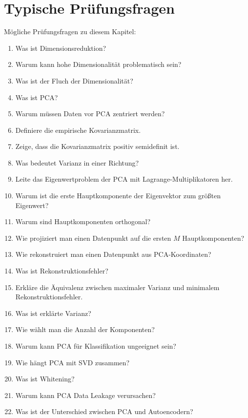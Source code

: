 \section{Typische Prüfungsfragen}

\begin{examtipbox}
Mögliche Prüfungsfragen zu diesem Kapitel:

\begin{enumerate}
    \item Was ist Dimensionsreduktion?
    \item Warum kann hohe Dimensionalität problematisch sein?
    \item Was ist der Fluch der Dimensionalität?
    \item Was ist PCA?
    \item Warum müssen Daten vor PCA zentriert werden?
    \item Definiere die empirische Kovarianzmatrix.
    \item Zeige, dass die Kovarianzmatrix positiv semidefinit ist.
    \item Was bedeutet Varianz in einer Richtung?
    \item Leite das Eigenwertproblem der PCA mit Lagrange-Multiplikatoren her.
    \item Warum ist die erste Hauptkomponente der Eigenvektor zum größten Eigenwert?
    \item Warum sind Hauptkomponenten orthogonal?
    \item Wie projiziert man einen Datenpunkt auf die ersten \(M\) Hauptkomponenten?
    \item Wie rekonstruiert man einen Datenpunkt aus PCA-Koordinaten?
    \item Was ist Rekonstruktionsfehler?
    \item Erkläre die Äquivalenz zwischen maximaler Varianz und minimalem Rekonstruktionsfehler.
    \item Was ist erklärte Varianz?
    \item Wie wählt man die Anzahl der Komponenten?
    \item Warum kann PCA für Klassifikation ungeeignet sein?
    \item Wie hängt PCA mit SVD zusammen?
    \item Was ist Whitening?
    \item Warum kann PCA Data Leakage verursachen?
    \item Was ist der Unterschied zwischen PCA und Autoencodern?
\end{enumerate}
\end{examtipbox}